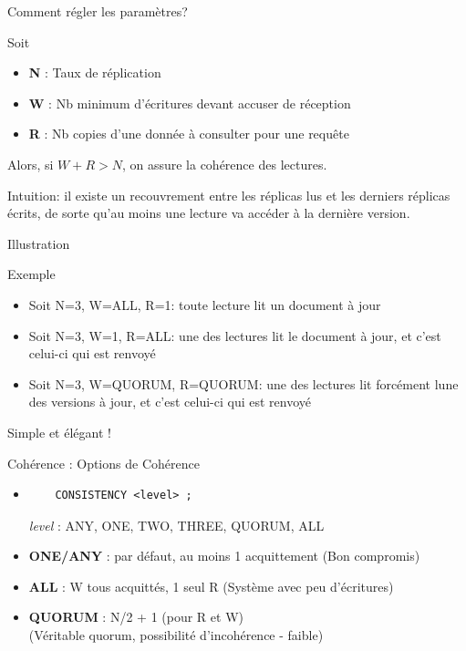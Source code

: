 \begin{frame}[fragile]{Comment régler les paramètres?}

Soit

\vfill

    \begin{itemize}
        \item \textbf{N} : Taux de réplication
        \item \textbf{W} : Nb minimum d'écritures devant accuser de réception
        \item \textbf{R} : Nb copies d'une donnée à consulter pour une requête
    \end{itemize} 

\alert{Alors, si $ W + R > N$, on assure la cohérence des lectures.}



\vfill

Intuition: il existe un recouvrement entre les réplicas lus et les derniers réplicas écrits, 
de sorte qu'au moins une lecture va accéder à la dernière version.

\end{frame}


\begin{frame}[fragile]{Illustration}

Exemple

\vfill

\begin{itemize}
    \item Soit N=3, W=ALL, R=1: toute lecture lit un document à jour
    \item Soit N=3, W=1, R=ALL: une des lectures lit le document à jour, et c'est celui-ci qui est renvoyé
    \item Soit N=3, W=QUORUM, R=QUORUM: une des lectures lit forcément lune des versions  à jour, et c'est celui-ci qui est renvoyé
    
\end{itemize}

\vfill
Simple et élégant !
\end{frame}




\begin{frame}[fragile]{Cohérence : Options de Cohérence}
\begin{itemize}
	\item 	\begin{verbatim}
	CONSISTENCY <level> ;
	\end{verbatim}
	\textit{level} : \footnotesize \textsc{ANY, ONE, TWO, THREE, QUORUM, ALL}\normalsize
	\item \textbf{\textsc{ONE/ANY}} : par défaut, au moins 1 acquittement	\footnotesize (Bon compromis)\normalsize
	\item \textbf{\textsc{ALL}} : W tous acquittés, 1 seul R \footnotesize (Système avec peu d'écritures)\normalsize
	\item \textbf{\textsc{QUORUM}} : N/2 + 1 (pour R et W) \\\footnotesize (Véritable quorum, possibilité d'incohérence - faible)\normalsize
	
\end{itemize}
\end{frame}